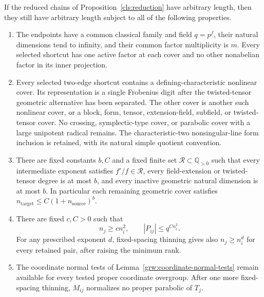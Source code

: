 \begin{proposition}\label{grw:remaining-paths}
If the reduced chains of Proposition~\ref{cls:reduction} have arbitrary
length, then they still have arbitrary length subject to all of the
following properties.
\begin{enumerate}[label=\textup{(\roman*)}]
\item The endpoints have a common classical family and field $q=p^f$,
their natural dimensions tend to infinity, and their common factor
multiplicity is $m$.  Every selected shortcut has one active factor
at each cover and no other nonabelian factor in its inner projection.

\item Every selected two-edge shortcut contains a defining-characteristic
nonlinear cover.  Its representation is a single Frobenius digit after
the twisted-tensor geometric alternative has been separated.  The
other cover is another such nonlinear cover, or a block, form, tensor,
extension-field, subfield, or twisted-tensor cover.  No crossing,
symplectic-type cover, or parabolic cover with a large unipotent radical
remains.  The characteristic-two nonsingular-line form inclusion is
retained, with its natural simple quotient convention.

\item There are fixed constants $b,C$ and a fixed finite set
$\mathcal R\subset\mathbb Q_{>0}$ such that every intermediate exponent
satisfies $f'/f\in\mathcal R$, every field-extension or twisted-tensor
degree is at most $b$, and every inactive geometric natural dimension
is at most $b$.  In particular each remaining geometric cover satisfies
$n_{\mathrm{target}}\le C(1+n_{\mathrm{source}})^b$.

\item There are fixed $c,C>0$ such that
\[
 n_j\ge c n_i^2,\qquad |P_{ij}|\le q^{C n_i^2}.
\]
For any prescribed exponent $d$, fixed-spacing thinning gives also
$n_j\ge n_i^d$ for every retained pair, after raising the minimum rank.

\item The coordinate normal tests of
Lemma~\ref{grw:coordinate-normal-tests} remain available for every tested proper
coordinate overgroup.  After one more fixed-spacing thinning,
$M_{ij}$ normalizes no proper parabolic of $T_j$.
\end{enumerate}
\end{proposition}

